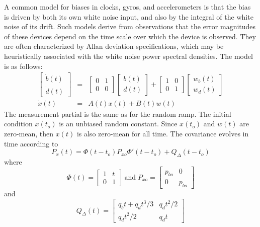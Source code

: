 A common model for biases in clocks, gyros, and accelerometers is that the bias is driven by both its own white noise input, and also by the integral of the white noise of its drift.  Such models derive from observations that the error magnitudes of these devices depend on the time scale over which the device is observed.  They are often characterized by Allan deviation specifications, which may be heuristically associated with the white noise power spectral densities.  The model is as follows:
\begin{eqnarray}
	\begin{bmatrix} \dot{b}(t) \\ \dot{d}(t) \end{bmatrix} &=&
	\begin{bmatrix} 0 & 1 \\ 0 & 0 \end{bmatrix}
	\begin{bmatrix} b(t) \\ d(t) \end{bmatrix} +
	\begin{bmatrix} 1 & 0 \\ 0 & 1 \end{bmatrix}
	\begin{bmatrix} w_b(t) \\ w_d(t) \end{bmatrix} \\
	\dot{x}(t) &=& A(t) x(t) + B(t) w(t)
\end{eqnarray}
The measurement partial is the same as for the random ramp.  The initial condition $x(t_o)$ is an unbiased random constant.  Since $x(t_o)$ and $w(t)$ are zero-mean, then $x(t)$ is also zero-mean for all time.  The covariance evolves in time according to
\begin{equation}
	P_x(t) = \Phi(t-t_o)P_{xo}\Phi'(t-t_o) + Q_\Delta(t-t_o)
\end{equation}
where
\begin{equation}
	\Phi(t) = \begin{bmatrix} 1 & t \\ 0 & 1 \end{bmatrix} \, \text{and} \;
	P_{xo} = \begin{bmatrix} p_{bo} & 0 \\ 0 & p_{\dot{b}o} \end{bmatrix}
\end{equation}
and
\begin{equation}
	Q_\Delta(t) = \begin{bmatrix} q_b t + q_d t^3/3 & q_d t^2/2 \\ q_d t^2/2 & q_d t \end{bmatrix}
\end{equation}
